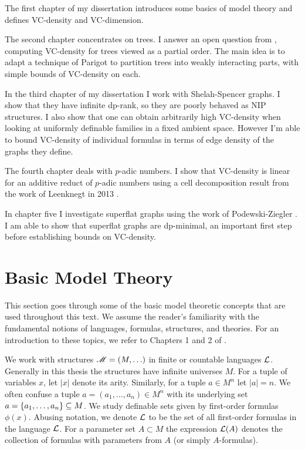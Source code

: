 The first chapter of my dissertation introduces some basics of model theory and defines VC-density and VC-dimension.

The second chapter concentrates on trees.
I answer an open question from \cite{density}, computing VC-density for trees viewed as a partial order.
The main idea is to adapt a technique of Parigot \cite{parigot_trees} to partition trees into weakly interacting parts, with simple bounds of VC-density on each.

In the third chapter of my dissertation I work with Shelah-Spencer graphs.
I show that they have infinite dp-rank, so they are poorly behaved as NIP structures.
I also show that one can obtain arbitrarily high VC-density when looking at uniformly definable families in a fixed ambient space.
However I'm able to bound VC-density of individual formulas in terms of edge density of the graphs they define.

The fourth chapter deals with $p$-adic numbers.
I show that VC-density is linear for an additive reduct of $p$-adic numbers
using a cell decomposition result from the work of Leenknegt in 2013 \cite{reduct}.

In chapter five I investigate superflat graphs using the work of
Podewski-Ziegler \cite {stable_graphs}.
I am able to show that superflat graphs are dp-minimal, an important first step before establishing bounds on VC-density.

\section{Basic Model Theory}

This section goes through some of the basic model theoretic concepts that are used throughout this text.
We assume the reader's familiarity with the fundamental notions of languages, formulas, structures, and theories.
For an introduction to these topics, we refer to Chapters 1 and 2 of \cite{tent}.

We work with structures $\mathscr M = (M, \ldots)$ in finite or countable languages $\mathcal L$.
Generally in this thesis the structures have infinite universes $M$.
For a tuple of variables $x$, let $|x|$ denote its arity.
Similarly, for a tuple $a \in M^n$ let $|a|=n$.
We often confuse a tuple $a = (a_1, \ldots, a_n) \in M^n$ with its underlying set $a = \left\{a_1, \ldots, a_n\right\} \subseteq M$.
We study definable sets given by first-order formulas $\phi(x)$.
Abusing notation, we denote $\mathcal L$ to be the set of all first-order formulas in the language $\mathcal L$.
For a parameter set $A \subset M$ the expression $\mathcal L(A)$ denotes the collection of formulas
with parameters from $A$ (or simply $A$-formulas).

